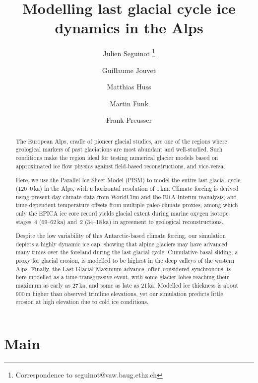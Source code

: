 \documentclass{article}
\title{Modelling last glacial cycle ice dynamics in the Alps}
\author[1]{Julien Seguinot%
           \thanks{Correspondence to seguinot@vaw.baug.ethz.ch}}
\author[1]{Guillaume Jouvet}
\author[1]{Matthias Huss}
\author[1]{Martin Funk}
\author[2]{Frank Preusser}
\affil[1]{Laboratory of Hydraulics, Hydrology and Glaciology,
          ETH Zürich, Switzerland}
\affil[2]{Institute of Earth and Environmental Sciences,
          University of Freiburg, Germany}
\begin{document}

\maketitle

\begin{abstract}

    The European Alps, cradle of pioneer glacial studies, are one of the
    regions where geological markers of past glaciations are most abundant and
    well-studied. Such conditions make the region ideal for testing numerical
    glacier models based on approximated ice flow physics against field-based
    reconstructions, and vice-versa.

    Here, we use the Parallel Ice Sheet Model (PISM) to model the entire last
    glacial cycle (120--0\,ka) in the Alps, with a horizontal resolution of
    1\,km. Climate forcing is derived using present-day climate data from
    WorldClim and the ERA-Interim reanalysis, and time-dependent temperature
    offsets from multiple paleo-climate proxies, among which only the EPICA ice
    core record yields glacial extent during marine oxygen isotope stages~4
    (69--62\,ka) and~2 (34--18\,ka) in agreement to geological reconstructions.

    Despite the low variability of this Antarctic-based climate forcing, our
    simulation depicts a highly dynamic ice cap, showing that alpine glaciers
    may have advanced many times over the foreland during the last glacial
    cycle. Cumulative basal sliding, a proxy for glacial erosion, is modelled
    to be highest in the deep valleys of the western Alps. Finally, the Last
    Glacial Maximum advance, often considered synchronous, is here modelled as
    a time-transgressive event, with some glacier lobes reaching their maximum
    as early as 27\,ka, and some as late as 21\,ka. Modelled ice thickness is
    about 900\,m higher than observed trimline elevations, yet our simulation
    predicts little erosion at high elevation due to cold ice conditions.

\end{abstract}

\section{Main}
\end{document}
